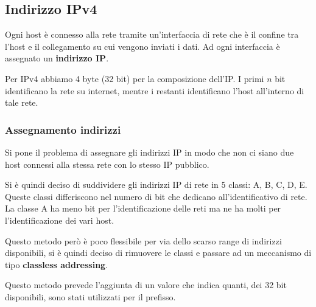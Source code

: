 \subsection{Indirizzo IPv4}
Ogni host è connesso alla rete tramite un'interfaccia di rete che è il confine tra l'host e il 
collegamento su cui vengono inviati i dati. Ad ogni interfaccia è assegnato un 
\textbf{indirizzo IP}.

Per IPv4 abbiamo 4 byte (32 bit) per la composizione dell'IP. I primi $n$ bit identificano la rete
su internet, mentre i restanti identificano l'host all'interno di tale rete.

\subsubsection{Assegnamento indirizzi}
Si pone il problema di assegnare gli indirizzi IP in modo che non ci siano due host connessi alla
stessa rete con lo stesso IP pubblico.

Si è quindi deciso di suddividere gli indirizzi IP di rete in 5 classi: A, B, C, D, E. Queste 
classi differiscono nel numero di bit che dedicano all'identificativo di rete. La classe A ha meno
bit per l'identificazione delle reti ma ne ha molti per l'identificazione dei vari host.

Questo metodo però è poco flessibile per via dello scarso range di indirizzi disponibili, si è
quindi deciso di rimuovere le classi e passare ad un meccanismo di tipo \textbf{classless 
addressing}.

Questo metodo prevede l'aggiunta di un valore che indica quanti, dei 32 bit disponibili, sono stati
utilizzati per il prefisso.
